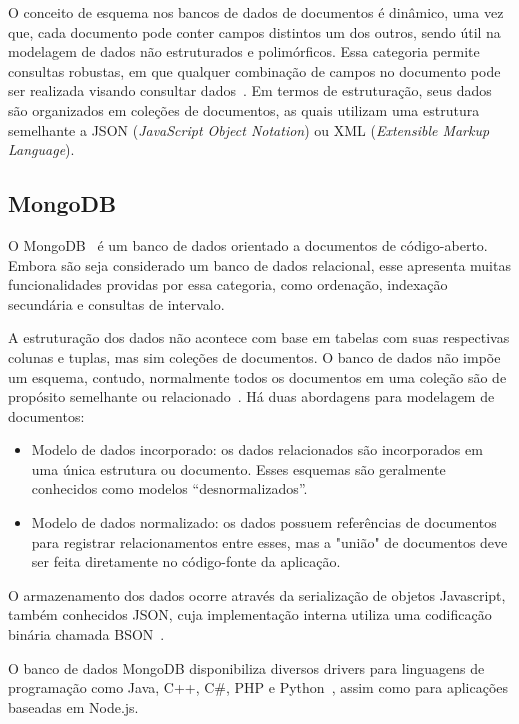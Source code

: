 \documentclass[12pt]{article}
\begin{document}
O conceito de esquema nos bancos de dados de documentos é dinâmico, uma vez que, cada documento pode conter campos distintos um dos outros, sendo útil na modelagem de dados não estruturados e polimórficos. 
Essa categoria permite consultas robustas, em que qualquer combinação de campos no documento pode ser realizada visando consultar dados~\cite{patil:2017}.
Em termos de estruturação, seus dados são organizados em coleções de documentos, as quais utilizam uma estrutura semelhante a JSON (\emph{JavaScript Object Notation}) ou XML (\emph{Extensible Markup Language}). 

\subsection{MongoDB}

O MongoDB~\cite{membrey2011definitive} é um banco de dados orientado a documentos de código-aberto. Embora são seja considerado um banco de dados relacional, esse apresenta muitas funcionalidades providas por essa categoria, como ordenação, indexação secundária e consultas de intervalo.

A estruturação dos dados não acontece com base em tabelas com suas respectivas colunas e tuplas, mas sim coleções de documentos.
O banco de dados não impõe um esquema, contudo, normalmente todos os documentos em uma coleção são de propósito semelhante ou relacionado~\cite{kanade2014study,lutu2015big}. Há duas abordagens para modelagem de documentos: 

\begin{itemize}
\item Modelo de dados incorporado: os dados relacionados são incorporados em uma única estrutura ou documento. Esses esquemas são geralmente conhecidos como modelos “desnormalizados”.
\item Modelo de dados normalizado: os dados possuem referências de documentos para registrar relacionamentos entre esses, mas a "união" de documentos deve ser feita diretamente no código-fonte da aplicação.
\end{itemize}

O armazenamento dos dados ocorre através da serialização de objetos Javascript, também conhecidos JSON, cuja implementação interna utiliza uma codificação binária chamada BSON~\cite{bson}.

O banco de dados MongoDB disponibiliza diversos drivers para linguagens de programação como Java, C++, C\#, PHP e Python~\cite{lutu2015big}, assim como para aplicações baseadas em Node.js.
\end{document}
